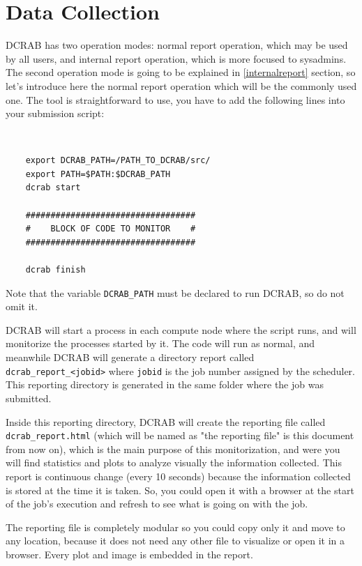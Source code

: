 \documentclass[10pt,a4paper]{report}
\begin{document}
\section{Data Collection}

DCRAB has two operation modes: normal report operation, which may be used by all users, and internal report operation, which is more focused to sysadmins. The second operation mode is going to be explained in \ref{internalreport} section, so let's introduce here the normal report operation which will be the commonly used one. The tool is straightforward to use, you have to add the following lines into your submission script:

\ \

\begin{verbatim}
    export DCRAB_PATH=/PATH_TO_DCRAB/src/
    export PATH=$PATH:$DCRAB_PATH
    dcrab start

    ##################################
    #    BLOCK OF CODE TO MONITOR    #
    ##################################

    dcrab finish
\end{verbatim}

Note that the variable \verb+DCRAB_PATH+ must be declared to run DCRAB, so do not omit it.

DCRAB will start a process in each compute node where the script runs, and will monitorize the processes started by it. The code will run as normal, and meanwhile DCRAB will generate a directory report called \verb+dcrab_report_<jobid>+ where \verb+jobid+ is the job number assigned by the scheduler. This reporting directory is generated in the same folder where the job was submitted.

Inside this reporting directory, DCRAB will create the reporting file called \verb+dcrab_report.html+ (which will be named as "the reporting file" is this document from now on), which is the main purpose of this monitorization, and were you will find statistics and plots to analyze visually the information collected. This report is continuous change (every 10 seconds) because the information collected is stored at the time it is taken. So, you could open it with a browser at the start of the job's execution and refresh to see what is going on with the job.

The reporting file is completely modular so you could copy only it and move to any location, because it does not need any other file to visualize or open it in a browser. Every plot and image is embedded in the report.
\end{document}
